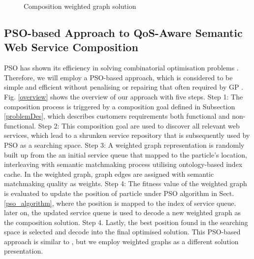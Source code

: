 \documentclass{IEEEtran}
\begin{document}
\begin{figure}[h]
\centering
{}
 \caption{Composition weighted graph solution}
 \label{wscs}
\end{figure}

\subsection{PSO-based Approach to QoS-Aware Semantic Web Service Composition}

PSO has shown its efficiency in solving combinatorial optimisation problems \cite{fukuyama2008fundamentals}. Therefore, we will employ a PSO-based approach, which is considered to be simple and efficient without penalising or repairing that often required by GP \cite{da2016particle}. Fig. \ref{overview} shows the overview of our approach with five steps. Step 1: The composition process is triggered by a composition goal defined in Subsection \ref{problemDes}, which describes customers requirements both functional and non-functional. Step 2: This composition goal are used to discover all relevant web services, which lead to a shrunken service repository that is subsequently used by PSO as a searching space. Step 3: A weighted graph representation is randomly built up from the an initial service queue that mapped to the particle's location, interleaving with semantic matchmaking process utilising ontology-based index cache. In the weighted graph, graph edges are assigned with semantic matchmaking quality as weights. Step 4: The fitness value of the weighted graph is evaluated to update the position of particle under PSO algorithm in Sect. \ref{pso_algorithm}, where the position is mapped to the index of service queue. later on, the updated service queue is used to decode a new weighted graph as the composition solution. Step 4. Lastly, the best position found in the searching space is selected and decode into the final optimised solution. This PSO-based approach is similar to \cite{da2016particle}, but we employ weighted graphs as a different solution presentation.
\end{document}
